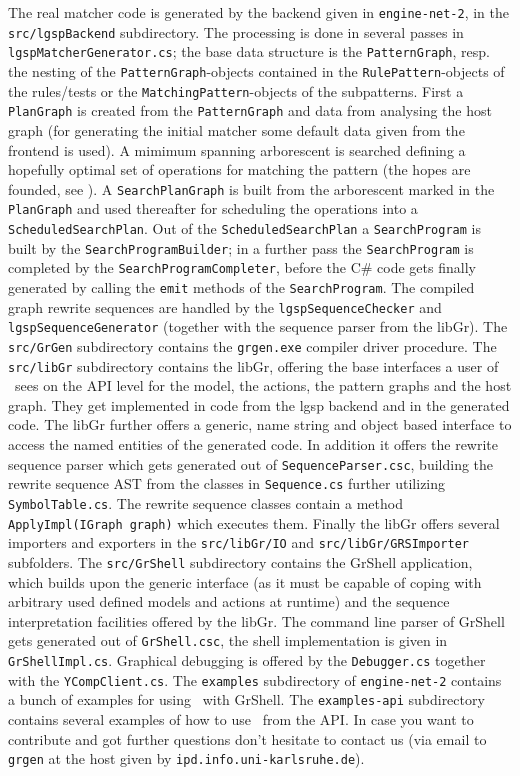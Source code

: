 The real matcher code is generated by the backend given in \texttt{engine-net-2}, in the \texttt{src/lgspBackend} subdirectory.
The processing is done in several passes in \texttt{lgsp\-Matcher\-Generator.cs}; the base data structure is the \texttt{PatternGraph}, resp. the nesting of the \texttt{PatternGraph}-objects contained in the \texttt{RulePattern}-objects of the rules/tests or the \texttt{Matching\-Pattern}-objects of the subpatterns.
First a \texttt{PlanGraph} is created from the \texttt{PatternGraph} and data from analysing the host graph (for generating the initial matcher some default data given from the frontend is used).
A mimimum spanning arborescent is searched defining a hopefully optimal set of operations for matching the pattern (the hopes are founded, see \cite{BKG:07}).
A \texttt{SearchPlanGraph} is built from the arborescent marked in the \texttt{PlanGraph} and used thereafter for scheduling the operations into a \texttt{ScheduledSearchPlan}.
Out of the \texttt{ScheduledSearchPlan} a \texttt{SearchProgram} is built by the \texttt{SearchProgramBuilder};
in a further pass the \texttt{SearchProgram} is completed by the \texttt{SearchProgramCompleter},
before the C\# code gets finally generated by calling the \texttt{emit} methods of the \texttt{SearchProgram}.
The compiled graph rewrite sequences are handled by the \texttt{lgspSequenceChecker} and \texttt{lgspSequenceGenerator} (together with the sequence parser from the libGr).
The \texttt{src/GrGen} subdirectory contains the \texttt{grgen.exe} compiler driver procedure.
The \texttt{src/libGr} subdirectory contains the libGr, offering the base interfaces a user of \GrG~sees on the API level for the model, the actions, the pattern graphs and the host graph.
They get implemented in code from the lgsp backend and in the generated code.
The libGr further offers a generic, name string and object based interface to access the named entities of the generated code.
In addition it offers the rewrite sequence parser which gets generated out of \texttt{SequenceParser.csc},
building the rewrite sequence AST from the classes in \texttt{Sequence.cs} further utilizing \texttt{SymbolTable.cs}.
The rewrite sequence classes contain a method \texttt{ApplyImpl(IGraph graph)} which executes them.
Finally the libGr offers several importers and exporters in the \texttt{src/libGr/IO} and \texttt{src/libGr/GRSImporter} subfolders.
The \texttt{src/GrShell} subdirectory contains the GrShell application, which builds upon the generic interface (as it must be capable of coping with arbitrary used defined models and actions at runtime) and the sequence interpretation facilities offered by the libGr.
The command line parser of GrShell gets generated out of \texttt{GrShell.csc}, the shell implementation is given in \texttt{GrShellImpl.cs}.
Graphical debugging is offered by the \texttt{Debugger.cs} together with the \texttt{YCompClient.cs}.
The \texttt{examples} subdirectory of \texttt{engine-net-2} contains a bunch of examples for using \GrG~with GrShell.
The \texttt{examples-api} subdirectory contains several examples of how to use \GrG~from the API.
In case you want to contribute and got further questions don't hesitate to contact us 
(via email to \texttt{grgen} at the host given by \texttt{ipd.info.uni-karlsruhe.de}).



